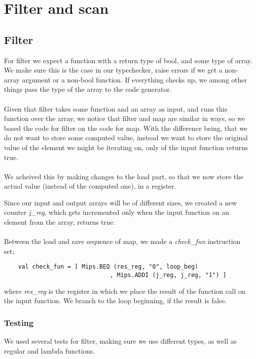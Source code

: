 \documentclass[paper=a4, fontsize=11pt]{scrartcl} %
\numberwithin{equation}{section} %
\numberwithin{figure}{section} %
\numberwithin{table}{section} %
\begin{document}
\section{Filter and scan}

	\subsection{Filter}
	For filter we expect a function with a return type of bool, and some type of array. We make sure this is the case in our typechecker, raise errors if we get a non-array argument or a non-bool function. If everything checks up, we among other things pass the type of the array to the code generator.
	\\\\
	Given that filter takes some function and an array as input, and runs this function over the array, we notice that filter and map are similar in ways, so we based the code for filter on the code for map. With the difference being, that we do not want to store some computed value, instead we want to store the original value of the element we might be iterating on, only of the input function returns true.
	\\\\
	We acheived this by making changes to the load part, so that we now store the actual value (instead of the computed one), in a register.
	
	Since our input and output arrays will be of different sizes, we created a new counter \textit{j\_reg}, which gets incremented only when the input function on an element from the array, returns true.
	\\\\
	Between the load and save sequence of map, we made a \textit{check\_fun} instruction set;
	
	\begin{lstlisting}
	val check_fun = [ Mips.BEQ (res_reg, "0", loop_beg)
	                          , Mips.ADDI (j_reg, j_reg, "1") ]
	\end{lstlisting}
	where \textit{res\_reg} is the register in which we place the result of the function call on the input function. We branch to the loop beginning, if the result is false.

	\subsubsection{Testing}
	We used several tests for filter, making sure we use different types, as well as regular and lambda functions.
	
\end{document}

